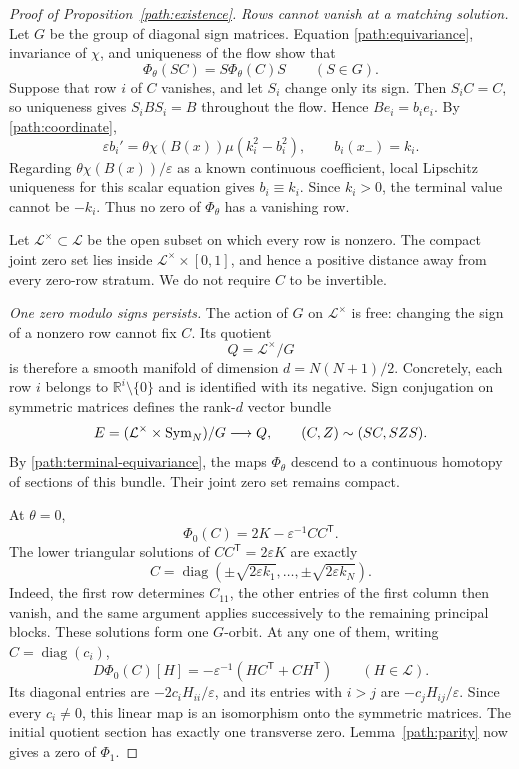 \begin{proof}[Proof of Proposition~\ref{path:existence}]
\smallskip
\noindent\emph{Rows cannot vanish at a matching solution.}
Let $G$ be the group of diagonal sign matrices.  Equation
\eqref{path:equivariance}, invariance of $\chi$, and uniqueness of the
flow show that
\begin{equation}\label{path:terminal-equivariance}
 \Phi_\theta(SC)=S\Phi_\theta(C)S
 \qquad(S\in G).
\end{equation}
Suppose that row $i$ of $C$ vanishes, and let $S_i$ change only its
sign.  Then $S_iC=C$, so uniqueness gives $S_iBS_i=B$ throughout the
flow.  Hence $Be_i=b_i e_i$.  By \eqref{path:coordinate},
\[
 \varepsilon b_i'
 =\theta\chi(B(x))\mu(k_i^2-b_i^2),
 \qquad b_i(x_-)=k_i.
\]
Regarding $\theta\chi(B(x))/\varepsilon$ as a known continuous
coefficient, local Lipschitz uniqueness for this scalar equation gives
$b_i\equiv k_i$.  Since $k_i>0$, the terminal value cannot be $-k_i$.
Thus no zero of $\Phi_\theta$ has a vanishing row.

Let $\mathcal L^\times\subset\mathcal L$ be the open subset on which
every row is nonzero.  The compact joint zero set lies inside
$\mathcal L^\times\times[0,1]$, and hence a positive distance away
from every zero-row stratum.  We do not require $C$ to be invertible.

\smallskip
\noindent\emph{One zero modulo signs persists.}
The action of $G$ on $\mathcal L^\times$ is free: changing the sign
of a nonzero row cannot fix $C$.  Its quotient
\[
 Q=\mathcal L^\times/G
\]
is therefore a smooth manifold of dimension $d=N(N+1)/2$.  Concretely,
each row $i$ belongs to $\mathbb R^i\setminus\{0\}$ and is identified
with its negative.  Sign conjugation on symmetric matrices defines
the rank-$d$ vector bundle
\[
 E=(\mathcal L^\times\times\operatorname{Sym}_N)/G
 \longrightarrow Q,
 \qquad
 (C,Z)\sim(SC,SZS).
\]
By \eqref{path:terminal-equivariance}, the maps $\Phi_\theta$ descend
to a continuous homotopy of sections of this bundle.  Their joint
zero set remains compact.

At $\theta=0$,
\[
 \Phi_0(C)=2K-\varepsilon^{-1}CC^{\mathsf T}.
\]
The lower triangular solutions of $CC^{\mathsf T}=2\varepsilon K$
are exactly
\[
 C=\operatorname{diag}
   (\pm\sqrt{2\varepsilon k_1},\ldots,
    \pm\sqrt{2\varepsilon k_N}).
\]
Indeed, the first row determines $C_{11}$, the other entries of the
first column then vanish, and the same argument applies successively
to the remaining principal blocks.  These solutions form one $G$-orbit.
At any one of them, writing $C=\operatorname{diag}(c_i)$,
\[
 D\Phi_0(C)[H]
 =-\varepsilon^{-1}(HC^{\mathsf T}+CH^{\mathsf T})
 \qquad(H\in\mathcal L).
\]
Its diagonal entries are $-2c_iH_{ii}/\varepsilon$, and its entries
with $i>j$ are $-c_jH_{ij}/\varepsilon$.  Since every $c_i\ne0$, this
linear map is an isomorphism onto the symmetric matrices.  The
initial quotient section has exactly one transverse zero.
Lemma~\ref{path:parity} now gives a zero of $\Phi_1$.


\end{proof}
